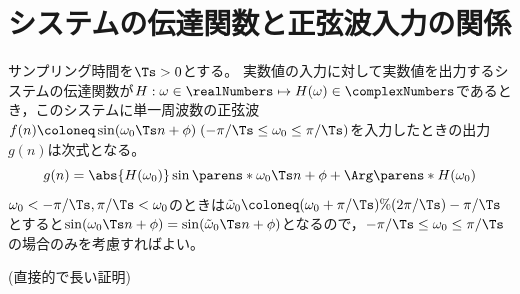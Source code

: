     \section{システムの伝達関数と正弦波入力の関係}
        \begin{shadebox}
            サンプリング時間を$\Ts>0$とする。
            実数値の入力に対して実数値を出力するシステムの伝達関数が$H:\omega\in\realNumbers\mapsto H(\omega)\in\complexNumbers$であるとき，このシステムに単一周波数の正弦波$f(n) \coloneq \sin(\omega_0 \Ts n + \phi)\;(-\pi/\Ts\leq\omega_0\leq\pi/\Ts)$を入力したときの出力$g(n)$は次式となる。
            \[ g(n) = \abs{H(\omega_0)}\sin\parens*{\omega_0 \Ts n + \phi + \Arg\parens*{H(\omega_0)}} \]
            $\omega_0<-\pi/\Ts, \pi/\Ts<\omega_0$のときは$\tilde{\omega}_0 \coloneq (\omega_0+\pi/\Ts)\%(2\pi/\Ts)-\pi/\Ts$とすると$\sin(\omega_0 \Ts n + \phi) = \sin(\tilde{\omega}_0 \Ts n + \phi)$となるので，$-\pi/\Ts\leq\omega_0\leq\pi/\Ts$の場合のみを考慮すればよい。
        \end{shadebox}
        (直接的で長い証明)
